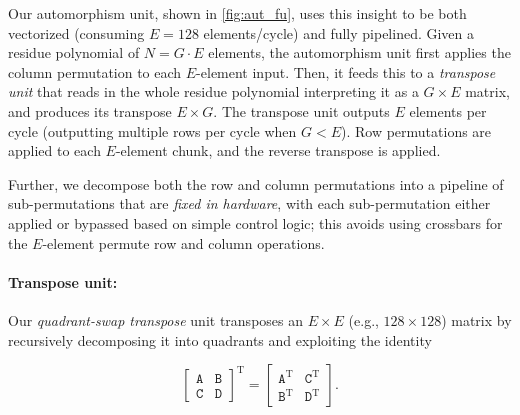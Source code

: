 \figautfu
Our automorphism unit, shown in \autoref{fig:aut_fu},
uses this insight to be both vectorized (consuming $E=128$ elements/cycle) and fully pipelined.
Given a residue polynomial of $N=G\cdot E$ elements, the automorphism unit first applies the column permutation
to each $E$-element input.
Then, it feeds this to a \emph{transpose unit} that reads in the whole residue polynomial interpreting it as a $G\times E$ matrix,
and produces its transpose $E\times G$.
The transpose unit outputs $E$ elements per cycle (outputting multiple rows per cycle when $G < E$).
Row permutations are applied to each $E$-element chunk, and the reverse transpose is applied.


Further, we decompose both the row and column permutations into a pipeline of sub-permutations that are \textit{fixed in hardware},
with each sub-permutation either applied or bypassed based on simple control logic; this avoids using crossbars for the $E$-element permute row and column operations.

\figQuadrantSwap

\paragraph{Transpose unit:}
Our \textit{quadrant-swap transpose} unit transposes an $E \times E$ (e.g., $128\times 128$) matrix by recursively decomposing it into quadrants and exploiting
the identity

\begin{equation*}
  \left[ \begin{array}{c|c}
      \texttt{A} & \texttt{B}\\
      \hline
      \texttt{C} & \texttt{D}
  \end{array}\right]^{\textrm{T}} =   \left[ \begin{array}{c|c}
      \texttt{A}^{\textrm{T}} & \texttt{C}^{\textrm{T}} \\
      \hline
      \texttt{B}^{\textrm{T}} & \texttt{D}^{\textrm{T}}
  \end{array}\right].
\end{equation*}

